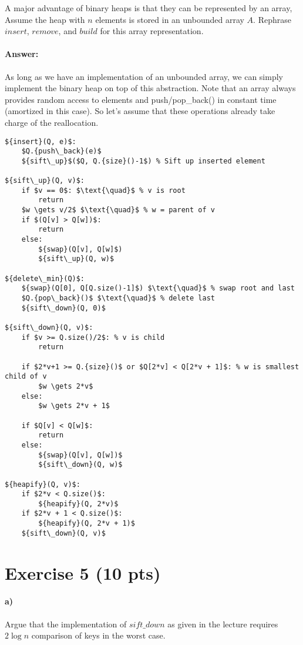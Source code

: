 \documentclass[a4paper]{article}
\begin{document}
A major advantage of binary heaps is that they can be represented by an array, Assume the heap with $n$ elements is stored in an unbounded array $A$. Rephrase ${insert}$, ${remove}$, and ${build}$ for this array representation.

\paragraph{Answer:}

As long as we have an implementation of an unbounded array, we can simply implement the binary heap on top of this abstraction. Note that an array always provides random access to elements and push/pop\_back() in constant time (amortized in this case). So let's assume that these operations already take charge of the reallocation.

\begin{lstlisting}[mathescape]
${insert}(Q, e)$:
    $Q.{push\_back}(e)$
    ${sift\_up}$($Q, Q.{size}()-1$) % Sift up inserted element
    
${sift\_up}(Q, v)$:
    if $v == 0$: $\text{\quad}$ % v is root
        return
    $w \gets v/2$ $\text{\quad}$ % w = parent of v
    if $(Q[v] > Q[w])$:
        return
    else:
        ${swap}(Q[v], Q[w]$)
        ${sift\_up}(Q, w)$

${delete\_min}(Q)$:
    ${swap}(Q[0], Q[Q.size()-1]$) $\text{\quad}$ % swap root and last
    $Q.{pop\_back}()$ $\text{\quad}$ % delete last
    ${sift\_down}(Q, 0)$

${sift\_down}(Q, v)$:
    if $v >= Q.size()/2$: % v is child
        return

    if $2*v+1 >= Q.{size}()$ or $Q[2*v] < Q[2*v + 1]$: % w is smallest child of v
        $w \gets 2*v$
    else:
        $w \gets 2*v + 1$
        
    if $Q[v] < Q[w]$:
        return
    else:
        ${swap}(Q[v], Q[w])$
        ${sift\_down}(Q, w)$

${heapify}(Q, v)$:
    if $2*v < Q.size()$:
        ${heapify}(Q, 2*v)$
    if $2*v + 1 < Q.size()$:
        ${heapify}(Q, 2*v + 1)$
    ${sift\_down}(Q, v)$
\end{lstlisting}

\section{Exercise 5 (10 pts)}

\paragraph{a) } Argue that the implementation of ${sift\_down}$ as given in the lecture requires $2 \log n$ comparison of keys in the worst case.
\end{document}
